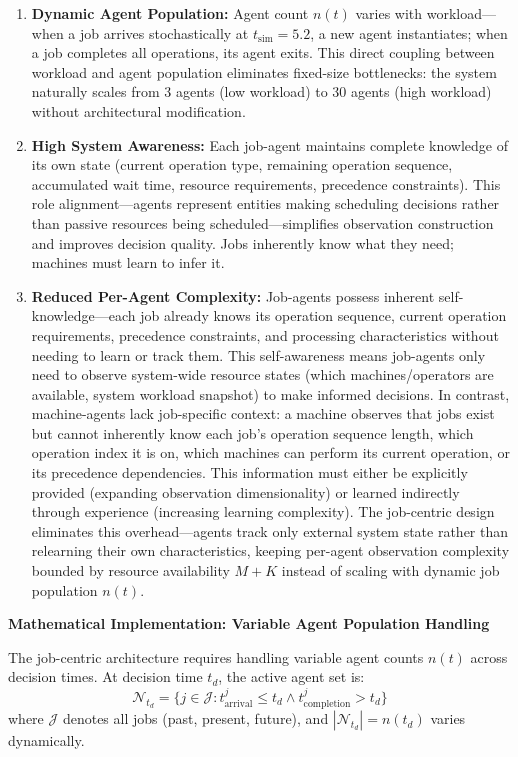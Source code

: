 \begin{enumerate}
\item \textbf{Dynamic Agent Population:} Agent count \( n(t) \) varies with workload—when a job arrives stochastically at \( t_{\text{sim}} = 5.2 \), a new agent instantiates; when a job completes all operations, its agent exits. This direct coupling between workload and agent population eliminates fixed-size bottlenecks: the system naturally scales from 3 agents (low workload) to 30 agents (high workload) without architectural modification.

\item \textbf{High System Awareness:} Each job-agent maintains complete knowledge of its own state (current operation type, remaining operation sequence, accumulated wait time, resource requirements, precedence constraints). This role alignment—agents represent entities making scheduling decisions rather than passive resources being scheduled—simplifies observation construction and improves decision quality. Jobs inherently know what they need; machines must learn to infer it.

\item \textbf{Reduced Per-Agent Complexity:} Job-agents possess inherent self-knowledge—each job already knows its operation sequence, current operation requirements, precedence constraints, and processing characteristics without needing to learn or track them. This self-awareness means job-agents only need to observe system-wide resource states (which machines/operators are available, system workload snapshot) to make informed decisions. In contrast, machine-agents lack job-specific context: a machine observes that jobs exist but cannot inherently know each job's operation sequence length, which operation index it is on, which machines can perform its current operation, or its precedence dependencies. This information must either be explicitly provided (expanding observation dimensionality) or learned indirectly through experience (increasing learning complexity). The job-centric design eliminates this overhead—agents track only external system state rather than relearning their own characteristics, keeping per-agent observation complexity bounded by resource availability \( M + K \) instead of scaling with dynamic job population \( n(t) \).
\end{enumerate}

\textbf{Mathematical Implementation: Variable Agent Population Handling}

The job-centric architecture requires handling variable agent counts \( n(t) \) across decision times. At decision time \( t_d \), the active agent set is:
\[
\mathcal{N}_{t_d} = \{j \in \mathcal{J} : t_{\text{arrival}}^j \leq t_d \land t_{\text{completion}}^j > t_d\}
\]
where \( \mathcal{J} \) denotes all jobs (past, present, future), and \( |\mathcal{N}_{t_d}| = n(t_d) \) varies dynamically.

